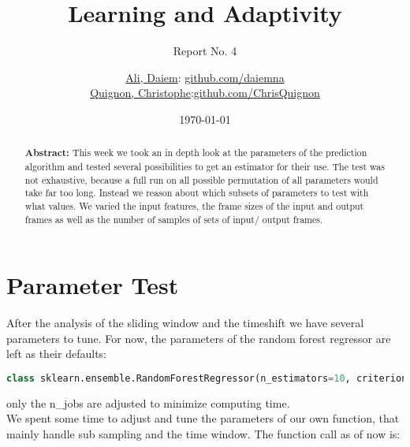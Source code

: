 \documentclass{scrartcl}
\begin{document}
\title{Learning and Adaptivity}
\subtitle{Report No. 4}
\author{
  \href{daiem.ali@smail.inf.h-brs.de}{Ali, Daiem}: \href{https://github.com/daiemna}{github.com/daiemna}\\
  \href{christophe.quignon@smail.inf.h-brs.de}{Quignon, Christophe}:\href{https://github.com/ChrisQuignon}{github.com/ChrisQuignon}
}
\date{\today}


\maketitle



\begin{abstract}
\textbf{Abstract:}
This week we took an in depth look at the parameters of the prediction algorithm and tested several possibilities to get an estimator for their use. The test was not exhaustive, because a full run on all possible permutation of all parameters would take far too long. Instead we reason about which subsets of parameters to test with what values. We varied the input features, the frame sizes of the input and output frames as well as the number of samples of sets of input/ output frames. 
\end{abstract}

\section{Parameter Test}
\label{sec:parameter}
After the analysis of the sliding window and the timeshift we have several parameters to tune. For now, the parameters of the random forest regressor are left as their defaults:
\begin{lstlisting}[language=Python]
class sklearn.ensemble.RandomForestRegressor(n_estimators=10, criterion='mse', max_depth=None, min_samples_split=2, min_samples_leaf=1, min_weight_fraction_leaf=0.0, max_features='auto', max_leaf_nodes=None, bootstrap=True, oob_score=False, n_jobs=1, random_state=None, verbose=0, warm_start=False)
\end{lstlisting}

only  the n\_jobs are adjusted to minimize computing time.\\
We spent some time to adjust and tune the parameters of our own function, that mainly handle sub sampling and the time window. The function call as of now is:
\end{document}
